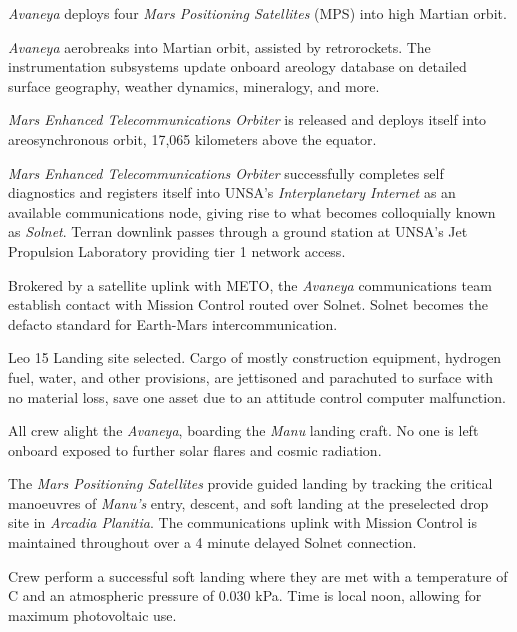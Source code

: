 {\it Avaneya} deploys four {\it Mars Positioning Satellites} (MPS) into high Martian orbit.
\StopTimelineDate

{\it Avaneya} aerobreaks into Martian orbit, assisted by retrorockets. The instrumentation subsystems update onboard areology database on detailed surface geography, weather dynamics, mineralogy, and more.

{\it Mars Enhanced Telecommunications Orbiter} is released and deploys itself into areosynchronous orbit, 17,065 kilometers above the equator.

{\it Mars Enhanced Telecommunications Orbiter} successfully completes self diagnostics and registers itself into UNSA's {\it Interplanetary Internet} as an available communications node, giving rise to what becomes colloquially known as {\it Solnet}. Terran downlink passes through a ground station at UNSA's Jet Propulsion Laboratory providing tier 1 network access.

Brokered by a satellite uplink with METO, the {\it Avaneya} communications team establish contact with Mission Control routed over Solnet. Solnet becomes the defacto standard for Earth-Mars intercommunication.
\StopTimelineDate

 Leo 15
Landing site selected. Cargo of mostly construction equipment, hydrogen fuel, water, and other provisions, are jettisoned and parachuted to surface with no material loss, save one asset due to an attitude control computer malfunction.
\StopTimelineDate

All crew alight the {\it Avaneya}, boarding the {\it Manu} landing craft. No one is left onboard exposed to further solar flares and cosmic radiation.

The {\it Mars Positioning Satellites} provide guided landing by tracking the critical manoeuvres of {\it Manu's} entry, descent, and soft landing at the preselected drop site in {\it Arcadia Planitia}. The communications uplink with Mission Control is maintained throughout over a 4 minute delayed Solnet connection.

Crew perform a successful soft landing where they are met with a temperature of C and an atmospheric pressure of 0.030 kPa. Time is local noon, allowing for maximum photovoltaic use.

